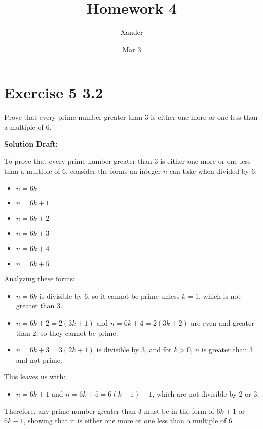 \documentclass{article}
\title{Homework 4}
\author{Xander}
\date{Mar 3}
\begin{document}
\maketitle

\section*{Exercise 5 3.2}  

Prove that every prime number greater than 3 is either one more or one less than a multiple of 6.

\vspace{0.5cm}
\noindent\textbf{Solution Draft:} 
\vspace{0.2cm}

To prove that every prime number greater than 3 is either one more or one less than a multiple of 6, consider the forms an integer \(n\) can take when divided by 6:

\begin{itemize}
    \item \(n = 6k\)
    \item \(n = 6k + 1\)
    \item \(n = 6k + 2\)
    \item \(n = 6k + 3\)
    \item \(n = 6k + 4\)
    \item \(n = 6k + 5\)
\end{itemize}

Analyzing these forms:

\begin{itemize}
    \item \(n = 6k\) is divisible by 6, so it cannot be prime unless \(k=1\), which is not greater than 3.
    \item \(n = 6k + 2 = 2(3k+1)\) and \(n = 6k + 4 = 2(3k+2)\) are even and greater than 2, so they cannot be prime.
    \item \(n = 6k + 3 = 3(2k+1)\) is divisible by 3, and for \(k>0\), \(n\) is greater than 3 and not prime.
\end{itemize}

This leaves us with:

\begin{itemize}
    \item \(n = 6k + 1\) and \(n = 6k + 5 = 6(k+1) - 1\), which are not divisible by 2 or 3.
\end{itemize}

Therefore, any prime number greater than 3 must be in the form of \(6k+1\) or \(6k-1\), showing that it is either one more or one less than a multiple of 6.
\end{document}
